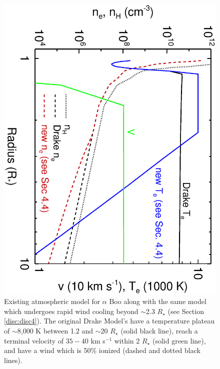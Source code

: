 \documentclass[iop]{emulateapj}
\begin{document}
\begin{figure}
\includegraphics[trim = 0mm 0mm 0mm 0mm, clip,scale=0.36,angle=90]{fig2.ps}
\caption{Existing atmospheric model for $\alpha$ Boo \cite[`model A']{1985pssl.proc..351D} along with the same model which undergoes rapid wind cooling beyond $\sim$2.3 $R_{\star}$ (see Section \ref{disc:disc4}). The original Drake Model's have a temperature plateau of $\sim$8,000 K between 1.2 and $\sim$20 $R_{\star}$ (solid black line), reach a terminal velocity of $35-40$ km s$^{-1}$ within 2 $R_{\star}$ (solid green line), and have a wind which is 50\% ionized (dashed and dotted black lines).}
\label{fig:fig0}
\end{figure}
\end{document}
